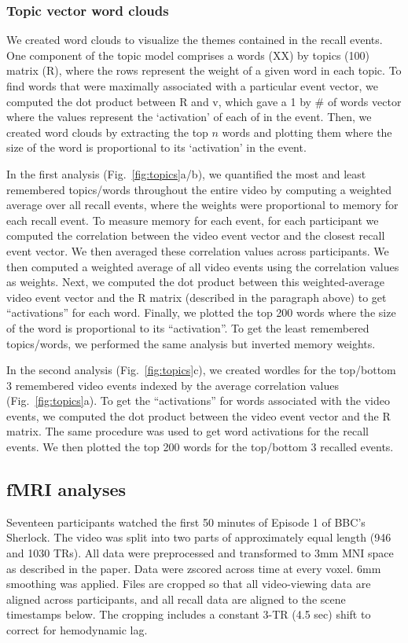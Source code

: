 \documentclass{article}
\begin{document}
{\subsubsection{Topic vector word clouds}
 We created word clouds to visualize the themes contained in the recall events. One component of the topic model comprises a words (XX) by topics (100) matrix (R), where the rows represent the weight of a given word in each topic.  To find words that were maximally associated with a particular event vector, we computed the dot product between R and v, which gave a 1 by \# of words vector where the values represent the `activation' of each of in the event. Then, we created word clouds by extracting the top $n$ words and plotting them where the size of the word is proportional to its `activation' in the event.

In the first analysis (Fig.~\ref{fig:topics}a/b), we quantified the most and least remembered topics/words throughout the entire video by computing a weighted average over all recall events, where the weights were proportional to memory for each recall event. To measure memory for each event, for each participant we computed the correlation between the video event vector and the closest recall event vector. We then averaged these correlation values across participants. We then computed a weighted average of all video events using the correlation values as weights. Next, we computed the dot product between this weighted-average video event vector and the R matrix (described in the paragraph above) to get ``activations'' for each word. Finally, we plotted the top 200 words where the size of the word is proportional to its ``activation''. To get the least remembered topics/words, we performed the same analysis but inverted memory weights.

In the second analysis (Fig.~\ref{fig:topics}c), we created wordles for the top/bottom 3 remembered video events indexed by the average correlation values (Fig.~\ref{fig:topics}a).  To get the ``activations'' for words associated with the video events, we computed the dot product between the video event vector and the R matrix. The same procedure was used to get word activations for the recall events. We then plotted the top 200 words for the top/bottom 3 recalled events.

 \subsection{fMRI analyses}
 Seventeen participants watched the first 50 minutes of Episode 1 of BBC's Sherlock. The video was split into two parts of approximately equal length (946 and 1030 TRs). All data were preprocessed and transformed to 3mm MNI space as described in the paper. Data were zscored across time at every voxel. 6mm smoothing was applied.
 Files are cropped so that all video-viewing data are aligned across participants, and all recall data are aligned to the scene timestamps below. The cropping includes a constant 3-TR (4.5 sec) shift to correct for hemodynamic lag.

}
\end{document}
